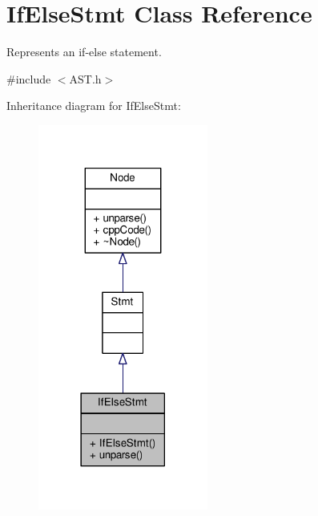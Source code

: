 \hypertarget{classIfElseStmt}{\section{If\-Else\-Stmt Class Reference}
\label{classIfElseStmt}
}


Represents an if-\/else statement. \par
  




{\ttfamily \#include $<$A\-S\-T.\-h$>$}



Inheritance diagram for If\-Else\-Stmt\-:\nopagebreak
\begin{figure}[H]
\begin{center}
\leavevmode
\includegraphics[width=158pt]{classIfElseStmt__inherit__graph}
\end{center}
\end{figure}


